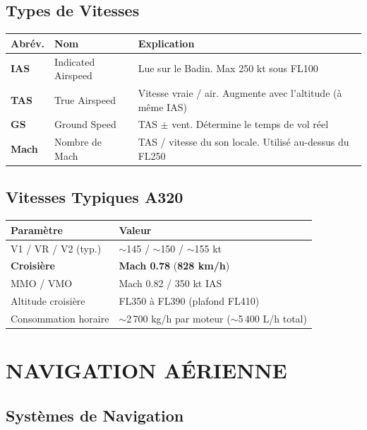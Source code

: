 \documentclass[11pt,a4paper]{article}
\begin{document}
\subsection{Types de Vitesses}

\begin{tabular}{p{2cm}p{5cm}p{7.5cm}}
\toprule
\textbf{Abrév.} & \textbf{Nom} & \textbf{Explication} \\
\midrule
\textbf{IAS} & Indicated Airspeed & Lue sur le Badin. Max 250 kt sous FL100 \\
\textbf{TAS} & True Airspeed & Vitesse vraie / air. Augmente avec l'altitude (à même IAS) \\
\textbf{GS} & Ground Speed & TAS $\pm$ vent. Détermine le temps de vol réel \\
\textbf{Mach} & Nombre de Mach & TAS / vitesse du son locale. Utilisé au-dessus du FL250 \\
\bottomrule
\end{tabular}

\subsection{Vitesses Typiques A320}

\begin{tabular}{p{5cm}p{9.5cm}}
\toprule
\textbf{Paramètre} & \textbf{Valeur} \\
\midrule
V1 / VR / V2 (typ.) & $\sim$145 / $\sim$150 / $\sim$155 kt \\
\rowcolor{aflight}
\textbf{Croisière} & \textbf{Mach 0.78} (\textbf{828 km/h}) \\
MMO / VMO & Mach 0.82 / 350 kt IAS \\
Altitude croisière & FL350 à FL390 (plafond FL410) \\
Consommation horaire & $\sim$2\,700 kg/h par moteur ($\sim$5\,400 L/h total) \\
\bottomrule
\end{tabular}

\newpage
\section{NAVIGATION AÉRIENNE}

\subsection{Systèmes de Navigation}
\end{document}
